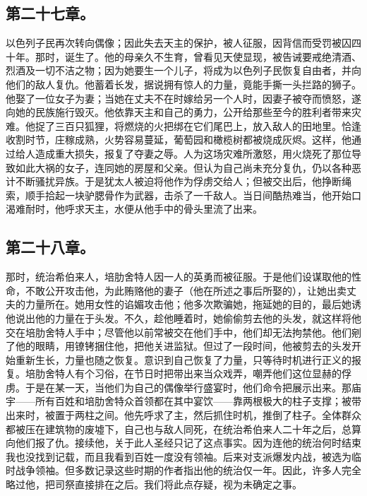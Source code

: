 
\subsection{第二十七章。}

以色列子民再次转向偶像；因此失去天主的保护，被人征服，因背信而受罚被囚四十年。那时，诞生了。他的母亲久不生育，曾看见天使显现，被告诫要戒绝清酒、烈酒及一切不洁之物；因为她要生一个儿子，将成为以色列子民恢复自由者，并向他们的敌人复仇。他蓄着长发，据说拥有惊人的力量，竟能手撕一头拦路的狮子。他娶了一位女子为妻；当她在丈夫不在时嫁给另一个人时，因妻子被夺而愤怒，遂向她的民族施行毁灭。他依靠天主和自己的勇力，公开给那些至今的胜利者带来灾难。他捉了三百只狐狸，将燃烧的火把绑在它们尾巴上，放入敌人的田地里。恰逢收割时节，庄稼成熟，火势容易蔓延，葡萄园和橄榄树都被烧成灰烬。这样，他通过给人造成重大损失，报复了夺妻之辱。人为这场灾难所激怒，用火烧死了那位导致如此大祸的女子，连同她的房屋和父亲。但认为自己尚未充分复仇，仍以各种恶计不断骚扰异族。于是犹太人被迫将他作为俘虏交给人；但被交出后，他挣断绳索，顺手拾起一块驴腮骨作为武器，击杀了一千敌人。当日间酷热难当，他开始口渴难耐时，他呼求天主，水便从他手中的骨头里流了出来。\par


\subsection{第二十八章。}

那时，统治希伯来人，培肋舍特人因一人的英勇而被征服。于是他们设谋取他的性命，不敢公开攻击他，为此贿赂他的妻子（他在所述之事后所娶的），让她出卖丈夫的力量所在。她用女性的谄媚攻击他；他多次欺骗她，拖延她的目的，最后她诱他说出他的力量在于头发。不久，趁他睡着时，她偷偷剪去他的头发，就这样将他交在培肋舍特人手中；尽管他以前常被交在他们手中，他们却无法拘禁他。他们剜了他的眼睛，用镣铐捆住他，把他关进监狱。但过了一段时间，他被剪去的头发开始重新生长，力量也随之恢复。意识到自己恢复了力量，只等待时机进行正义的报复。培肋舍特人有个习俗，在节日时把带出来当众戏弄，嘲弄他们这位显赫的俘虏。于是在某一天，当他们为自己的偶像举行盛宴时，他们命令把展示出来。那庙宇——所有百姓和培肋舍特众首领都在其中宴饮——靠两根极大的柱子支撑；被带出来时，被置于两柱之间。他先呼求了主，然后抓住时机，推倒了柱子。全体群众都被压在建筑物的废墟下，自己也与敌人同死，在统治希伯来人二十年之后，总算向他们报了仇。接续他，关于此人圣经只记了这点事实。因为连他的统治何时结束我也没找到记载，而且我看到百姓一度没有领袖。后来对支派爆发内战，被选为临时战争领袖。但多数记录这些时期的作者指出他的统治仅一年。因此，许多人完全略过他，把司祭直接排在之后。我们将此点存疑，视为未确定之事。\par


